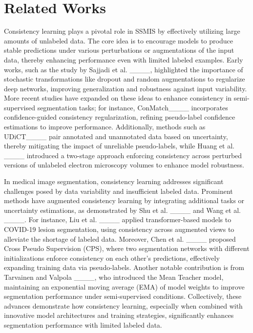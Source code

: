 \section{Related Works}
Consistency learning plays a pivotal role in SSMIS by effectively utilizing large amounts of unlabeled data. The core idea is to encourage models to produce stable predictions under various perturbations or augmentations of the input data, thereby enhancing performance even with limited labeled examples. Early works, such as the study by Sajjadi et al. ____, highlighted the importance of stochastic transformations like dropout and random augmentations to regularize deep networks, improving generalization and robustness against input variability. More recent studies have expanded on these ideas to enhance consistency in semi-supervised segmentation tasks; for instance, ConMatch____ incorporates confidence-guided consistency regularization, refining pseudo-label confidence estimations to improve performance. Additionally, methods such as UDiCT____ pair annotated and unannotated data based on uncertainty, thereby mitigating the impact of unreliable pseudo-labels, while Huang et al. ____ introduced a two-stage approach enforcing consistency across perturbed versions of unlabeled electron microscopy volumes to enhance model robustness.

In medical image segmentation, consistency learning addresses significant challenges posed by data variability and insufficient labeled data. Prominent methods have augmented consistency learning by integrating additional tasks or uncertainty estimations, as demonstrated by Shu et al. ____ and Wang et al. ____. For instance, Liu et al. ____ applied transformer-based models to COVID-19 lesion segmentation, using consistency across augmented views to alleviate the shortage of labeled data. Moreover, Chen et al. ____ proposed Cross Pseudo Supervision (CPS), where two segmentation networks with different initializations enforce consistency on each other's predictions, effectively expanding training data via pseudo-labels. Another notable contribution is from Tarvainen and Valpola ____, who introduced the Mean Teacher model, maintaining an exponential moving average (EMA) of model weights to improve segmentation performance under semi-supervised conditions. Collectively, these advances demonstrate how consistency learning, especially when combined with innovative model architectures and training strategies, significantly enhances segmentation performance with limited labeled data.




%